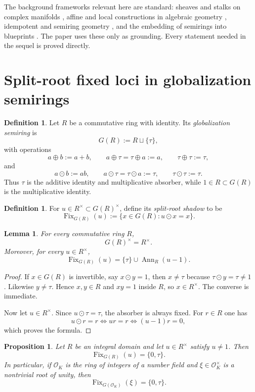 \documentclass[11pt,a4paper]{article}
\newtheorem{proposition}[theorem]{Proposition}
\newtheorem{lemma}[theorem]{Lemma}
\theoremstyle{definition}
\newtheorem{definition}[theorem]{Definition}
\theoremstyle{remark}
\DeclareMathOperator{\Fix}{Fix}
\DeclareMathOperator{\Ann}{Ann}
\newcommand{\taup}{\tau}
\begin{document}
The background frameworks relevant here are standard: sheaves and stalks on complex manifolds \cite{Lee}, affine and local constructions in algebraic geometry \cite{GrothendieckEGAII,Vakil}, idempotent and semiring geometry \cite{GaubertKatz,Gunawardena,DrosteKuichVogler}, and the embedding of semirings into blueprints \cite{Lorscheid}.  The paper uses these only as grounding.  Every statement needed in the sequel is proved directly.

\section{Split-root fixed loci in globalization semirings}

\begin{definition}
Let $R$ be a commutative ring with identity.  Its \emph{globalization semiring} is
\[
G(R):=R\sqcup\{\taup\},
\]
with operations
\[
a\oplus b:=a+b,\qquad a\oplus\taup=\taup\oplus a:=a,\qquad \taup\oplus\taup:=\taup,
\]
and
\[
a\odot b:=ab,\qquad a\odot\taup=\taup\odot a:=\taup,\qquad \taup\odot\taup:=\taup.
\]
Thus $\taup$ is the additive identity and multiplicative absorber, while $1\in R\subset G(R)$ is the multiplicative identity.
\end{definition}

\begin{definition}
For $u\in R^\times\subset G(R)^\times$, define its \emph{split-root shadow} to be
\[
\Fix_{G(R)}(u):=\{x\in G(R):u\odot x=x\}.
\]
\end{definition}

\begin{lemma}\label{lem:units-fix}
For every commutative ring $R$,
\[
G(R)^\times=R^\times.
\]
Moreover, for every $u\in R^\times$,
\[
\Fix_{G(R)}(u)=\{\taup\}\cup\Ann_R(u-1).
\]
\end{lemma}

\begin{proof}
If $x\in G(R)$ is invertible, say $x\odot y=1$, then $x\neq \taup$ because $\taup\odot y=\taup\neq1$.  Likewise $y\neq\taup$.  Hence $x,y\in R$ and $xy=1$ inside $R$, so $x\in R^\times$.  The converse is immediate.

Now let $u\in R^\times$.  Since $u\odot\taup=\taup$, the absorber is always fixed.  For $r\in R$ one has
\[
u\odot r=r \iff ur=r \iff (u-1)r=0,
\]
which proves the formula.
\end{proof}

\begin{proposition}\label{prop:split-root-domain}
Let $R$ be an integral domain and let $u\in R^\times$ satisfy $u\neq1$.  Then
\[
\Fix_{G(R)}(u)=\{0,\taup\}.
\]
In particular, if $\mathcal O_K$ is the ring of integers of a number field and $\xi\in\mathcal O_K^\times$ is a nontrivial root of unity, then
\[
\Fix_{G(\mathcal O_K)}(\xi)=\{0,\taup\}.
\]
\end{proposition}
\end{document}
